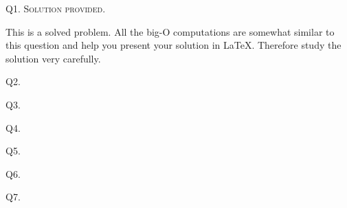 


\newpage
Q1. \textsc{Solution provided.}

This is a solved problem.
All the big-O computations are somewhat similar to this question
and help you present your solution in \LaTeX.
Therefore study the solution very carefully.



\newpage
\SOLUTION




\newpage
Q2.


\newpage
\SOLUTION




\newpage
Q3.


\newpage
\SOLUTION




\newpage
Q4.


\newpage
\SOLUTION




\newpage
Q5.


\newpage
\SOLUTION




\newpage
Q6.


\SOLUTION




\newpage
Q7.


\newpage
\SOLUTION




